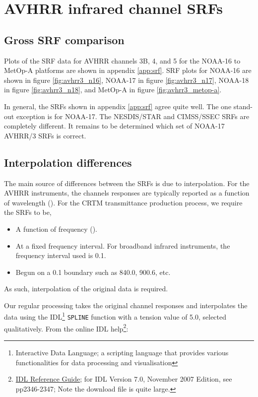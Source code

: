 \section{AVHRR infrared channel SRFs}

\subsection{Gross SRF comparison}
Plots of the SRF data for AVHRR channels 3B, 4, and 5 for the NOAA-16 to MetOp-A platforms are shown in appendix \ref{app:srf}. SRF plots for NOAA-16 are shown in figure \ref{fig:avhrr3_n16}, NOAA-17 in figure \ref{fig:avhrr3_n17}, NOAA-18 in figure \ref{fig:avhrr3_n18}, and MetOp-A in figure \ref{fig:avhrr3_metop-a}.

In general, the SRFs shown in appendix \ref{app:srf} agree quite well. The one stand-out exception is for NOAA-17. The NESDIS/STAR and CIMSS/SSEC SRFs are completely different. It remains to be determined which set of NOAA-17 AVHRR/3 SRFs is correct.


\subsection{Interpolation differences}
The main source of differences between the SRFs is due to interpolation. For the AVHRR instruments, the channels responses are typically reported as a function of wavelength (\micron). For the CRTM transmittance production process, we require the SRFs to be,
\begin{itemize}
  \item A function of frequency (\invcm).
  \item At a fixed frequency interval. For broadband infrared instruments, the frequency interval used is 0.1\invcm.
  \item Begun on a 0.1\invcm{} boundary such as 840.0, 900.6, etc.
\end{itemize}
As such, interpolation of the original data is required.

Our regular processing takes the original channel responses and interpolates the data using the IDL\footnote{Interactive Data Language; a scripting language that provides various functionalities for data processing and visualisation} \texttt{SPLINE} function with a tension value of 5.0, selected qualitatively. From the online IDL help\footnote{\href{http://www.ittvis.com/portals/0/pdfs/idl/refguide.pdf}{IDL Reference Guide}; for IDL Version 7.0, November 2007 Edition, see pp2346-2347; Note the download file is quite large.}:

